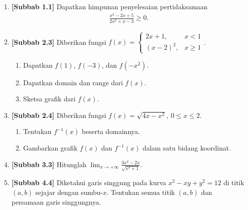 \documentclass[10pt,openany,a4paper]{article}
\theoremstyle{definition}
\theoremstyle{definition}
\theoremstyle{plain}
\begin{document}
\begin{enumerate}
    \item \textbf{[Subbab 1.1]} Dapatkan himpunan penyelesaian pertidaksamaan
    \begin{align*}
        \frac{x^2-2x+5}{2x^2+x-3}\geq 0.
    \end{align*}

    \item \textbf{[Subbab 2.3]} Diberikan fungsi $f(x)=\begin{cases}
        2x+1, & x<1\\
        (x-2)^2, & x\geq 1
    \end{cases}$.
    \begin{enumerate}
        \item Dapatkan $f(1)$, $f(-3)$, dan $f(-x^2)$.
        \item Dapatkan domain dan range dari $f(x)$.
        \item Sketsa grafik dari $f(x)$.
    \end{enumerate}

    \item \textbf{[Subbab 2.4]} Diberikan fungsi $f(x)=\sqrt{4x-x^2},\ 0\leq x\leq 2$.
    \begin{enumerate}
        \item Tentukan $f^{-1}(x)$ beserta domainnya.
        \item Gambarkan grafik $f(x)$ dan $f^{-1}(x)$ dalam satu bidang koordinat.
    \end{enumerate}

    \item \textbf{[Subbab 3.3]} Hitunglah $\displaystyle\lim_{x\to+\infty}\frac{3x^2-2x}{\sqrt{x^4+1}}$.

    \item \textbf{[Subbab 4.4]} Diketahui garis singgung pada kurva $x^2-xy+y^2=12$ di titik $(a,b)$ sejajar dengan sumbu-$x$. Tentukan semua titik $(a,b)$ dan persamaan garis singgungnya.
\end{enumerate}

\newpage
\end{document}
